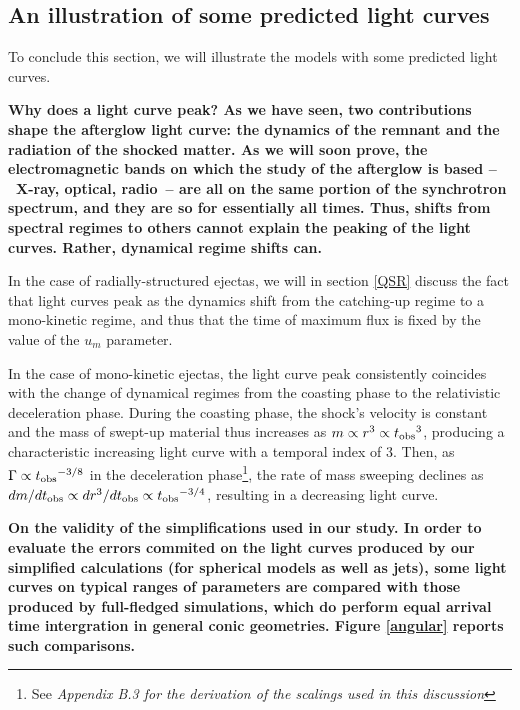 \subsection{An illustration of some predicted light curves}
To conclude this section, we will illustrate the models with some predicted light curves.


\bf{Why does a light curve peak? }As we have seen, two contributions shape the afterglow light curve: the dynamics of the remnant and the radiation of the shocked matter. As we will soon prove, the electromagnetic bands on which the study of the afterglow is based --~X-ray, optical, radio~-- are all on the same portion of the synchrotron spectrum, and they are so for essentially all times. Thus, shifts from spectral regimes to others cannot explain the peaking of the light curves. Rather, dynamical regime shifts can.

In the case of radially-structured ejectas, we will in section \ref{QSR} discuss the fact that light curves peak as the dynamics shift from the catching-up regime to a mono-kinetic regime, and thus that the time of maximum flux is fixed by the value of the $u_m$ parameter.

In the case of mono-kinetic ejectas, the light curve peak consistently coincides with the change of dynamical regimes from the coasting phase to the relativistic deceleration phase. During the coasting phase, the shock's velocity is constant and the mass of swept-up material thus increases as $m \propto r^3 \propto {t_{\mathrm{obs}}}^3$, producing a characteristic increasing light curve with a temporal index of $3$. Then, as $\Gamma \propto {t_{\mathrm{obs}}}^{-3/8}$ in the deceleration phase\footnote{See \it{Appendix B.3} for the derivation of the scalings used in this discussion}, the rate of mass sweeping declines as $dm/d{t_{\mathrm{obs}}} \propto dr^3/d{t_{\mathrm{obs}}} \propto  {t_{\mathrm{obs}}}^{-3/4}$, resulting in a decreasing light curve.

\bf{On the validity of the simplifications used in our study.} In order to evaluate the errors commited on the light curves produced by our simplified calculations (for spherical models as well as jets), some light curves on typical ranges of parameters are compared with those produced by full-fledged simulations, which do perform equal arrival time intergration in general conic geometries. Figure \ref{angular} reports such comparisons.


